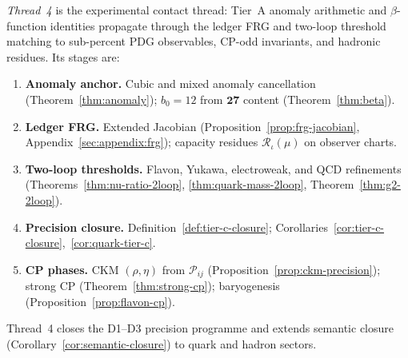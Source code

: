 \begin{definition}
\label{def:thread-4}
\emph{Thread~4} is the experimental contact thread: Tier~A anomaly arithmetic
and $\beta$-function identities propagate through the ledger FRG and two-loop
threshold matching to sub-percent PDG observables, CP-odd invariants, and
hadronic residues. Its stages are:
\begin{enumerate}[label=(\roman*),leftmargin=*]
  \item \textbf{Anomaly anchor.} Cubic and mixed anomaly cancellation
    (Theorem~\ref{thm:anomaly}); $b_0=12$ from $\mathbf{27}$ content
    (Theorem~\ref{thm:beta}).
  \item \textbf{Ledger FRG.} Extended Jacobian
    (Proposition~\ref{prop:frg-jacobian}, Appendix~\ref{sec:appendix:frg});
    capacity residues $\mathcal{R}_\iota(\mu)$ on observer charts.
  \item \textbf{Two-loop thresholds.} Flavon, Yukawa, electroweak, and QCD
    refinements (Theorems~\ref{thm:nu-ratio-2loop},
    \ref{thm:quark-mass-2loop}, Theorem~\ref{thm:g2-2loop}).
  \item \textbf{Precision closure.} Definition~\ref{def:tier-c-closure};
    Corollaries~\ref{cor:tier-c-closure},~\ref{cor:quark-tier-c}.
  \item \textbf{CP phases.} CKM $(\rho,\eta)$ from $\mathcal{P}_{ij}$
    (Proposition~\ref{prop:ckm-precision}); strong CP
    (Theorem~\ref{thm:strong-cp}); baryogenesis
    (Proposition~\ref{prop:flavon-cp}).
\end{enumerate}
Thread~4 closes the D1--D3 precision programme and extends semantic closure
(Corollary~\ref{cor:semantic-closure}) to quark and hadron sectors.
\end{definition}

